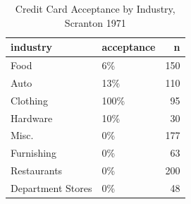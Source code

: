 \begin{table}
\centering
\caption{Credit Card Acceptance by Industry, Scranton 1971}
\centering
\begin{tabular}[t]{llr}
\toprule
industry & acceptance & n\\
\midrule
Food & 6\% & 150\\
Auto & 13\% & 110\\
Clothing & 100\% & 95\\
Hardware & 10\% & 30\\
Misc. & 0\% & 177\\
\addlinespace
Furnishing & 0\% & 63\\
Restaurants & 0\% & 200\\
Department Stores & 0\% & 48\\
\bottomrule
\end{tabular}
\end{table}
